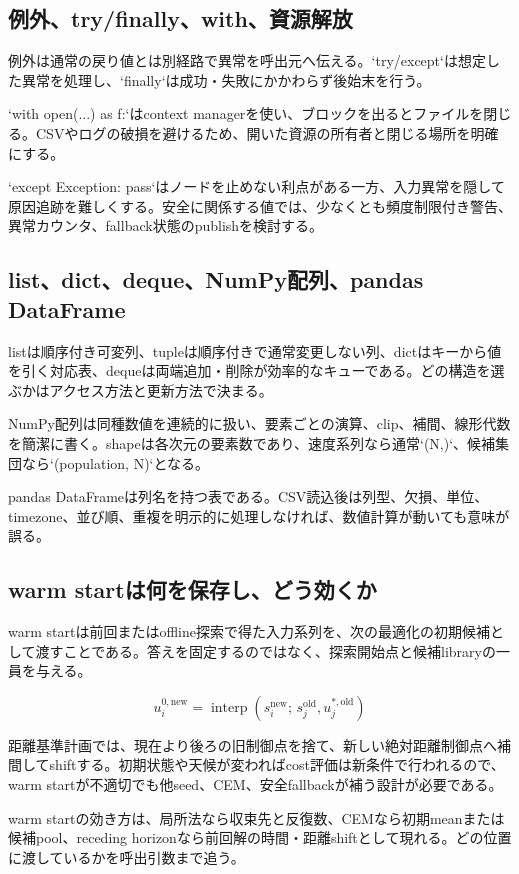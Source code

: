 \documentclass[a4paper,11pt]{article}
\begin{document}
\subsection{例外、try/finally、with、資源解放}
例外は通常の戻り値とは別経路で異常を呼出元へ伝える。`try/except`は想定した異常を処理し、`finally`は成功・失敗にかかわらず後始末を行う。


`with open(...) as f:`はcontext managerを使い、ブロックを出るとファイルを閉じる。CSVやログの破損を避けるため、開いた資源の所有者と閉じる場所を明確にする。


`except Exception: pass`はノードを止めない利点がある一方、入力異常を隠して原因追跡を難しくする。安全に関係する値では、少なくとも頻度制限付き警告、異常カウンタ、fallback状態のpublishを検討する。



\subsection{list、dict、deque、NumPy配列、pandas DataFrame}
listは順序付き可変列、tupleは順序付きで通常変更しない列、dictはキーから値を引く対応表、dequeは両端追加・削除が効率的なキューである。どの構造を選ぶかはアクセス方法と更新方法で決まる。


NumPy配列は同種数値を連続的に扱い、要素ごとの演算、clip、補間、線形代数を簡潔に書く。shapeは各次元の要素数であり、速度系列なら通常`(N,)`、候補集団なら`(population, N)`となる。


pandas DataFrameは列名を持つ表である。CSV読込後は列型、欠損、単位、timezone、並び順、重複を明示的に処理しなければ、数値計算が動いても意味が誤る。



\subsection{warm startは何を保存し、どう効くか}
warm startは前回またはoffline探索で得た入力系列を、次の最適化の初期候補として渡すことである。答えを固定するのではなく、探索開始点と候補libraryの一員を与える。


\[
u^{0,\mathrm{new}}_i=\operatorname{interp}\left(s_i^{\mathrm{new}};\,s_j^{\mathrm{old}},u_j^{\ast,\mathrm{old}}\right)
\]

距離基準計画では、現在より後ろの旧制御点を捨て、新しい絶対距離制御点へ補間してshiftする。初期状態や天候が変わればcost評価は新条件で行われるので、warm startが不適切でも他seed、CEM、安全fallbackが補う設計が必要である。


warm startの効き方は、局所法なら収束先と反復数、CEMなら初期meanまたは候補pool、receding horizonなら前回解の時間・距離shiftとして現れる。どの位置に渡しているかを呼出引数まで追う。
\end{document}

